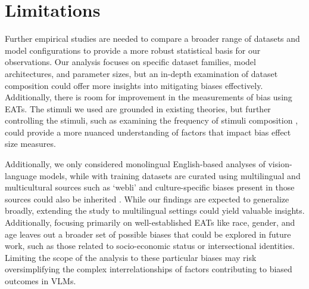 \section{Limitations}

Further empirical studies are needed to compare a broader range of datasets and model configurations to provide a more robust statistical basis for our observations. Our analysis focuses on specific dataset families, model architectures, and parameter sizes, but an in-depth examination of dataset composition could offer more insights into mitigating biases effectively. Additionally, there is room for improvement in the measurements of bias using EATs. The stimuli we used are grounded in existing theories, but further controlling the stimuli, such as examining the frequency of stimuli composition \citep{wilson2024gender, wolfe2021low}, could provide a more nuanced understanding of factors that impact bias effect size measures.

Additionally, we only considered monolingual English-based analyses of vision-language models, while with training datasets are curated using multilingual and multicultural sources such as `webli' \cite{chen2022pali} and culture-specific biases present in those sources could also be inherited \cite{ruggeri2023multi}. While our findings are expected to generalize broadly, extending the study to multilingual settings could yield valuable insights. Additionally, focusing primarily on well-established EATs like race, gender, and age leaves out a broader set of possible biases that could be explored in future work, such as those related to socio-economic status or intersectional identities. Limiting the scope of the analysis to these particular biases may risk oversimplifying the complex interrelationships of factors contributing to biased outcomes in VLMs.
